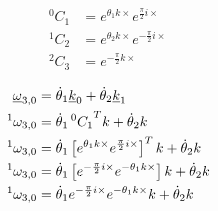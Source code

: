 \begin{solutionbox}[Q2-1]

\end{solutionbox}

\begin{solutionbox}[Q2-2]
    \begin{align*}
        {\,^0C_1} & =e^{\theta_1 k \times} e^{ \frac{\pi}{2} i \times} \\
        {\,^1C_2} & =e^{\theta_2 k \times} e^{-\frac{\pi}{2} i \times} \\
        {\,^2C_3} & =e^{-\frac{\pi}{2} k \times}
    \end{align*}

    \begin{align*}
        \underline{\omega}_{3,0}  & = \dot{\theta}_1 \underline{k}_0 + \dot{\theta}_2 \underline{k}_1                                                      \\
        {\,^1\omega_{3,0}} & = \dot{\theta}_1 {\,^0C_1}^{T} k + \dot{\theta}_2 k                                                      \\
        {\,^1\omega_{3,0}} & = \dot{\theta}_1 \left[e^{\theta_1 k \times} e^{ \frac{\pi}{2} i \times}\right]^{T} k + \dot{\theta}_2 k \\
        {\,^1\omega_{3,0}} & = \dot{\theta}_1 \left[e^{ -\frac{\pi}{2} i \times} e^{-\theta_1 k \times}\right] k + \dot{\theta}_2 k   \\
        {\,^1\omega_{3,0}} & = \dot{\theta}_1 e^{ -\frac{\pi}{2} i \times} e^{-\theta_1 k \times} k + \dot{\theta}_2 k                \\
    \end{align*}
\end{solutionbox}


